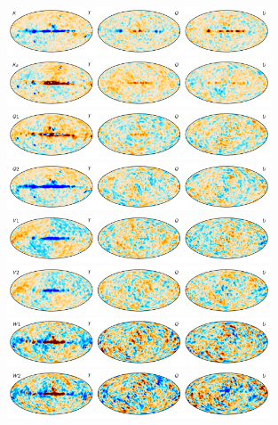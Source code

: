 \documentclass[twocolumn]{../../common/aa}
\begin{document}
\begin{figure}
	\centering
	\includegraphics[width=0.7\textwidth]{figures/compsep_res_K_IQU.pdf}\\
	\includegraphics[width=0.7\textwidth]{figures/compsep_res_Ka_IQU.pdf}\\
	\includegraphics[width=0.7\textwidth]{figures/compsep_res_Q1_IQU.pdf}\\
	\includegraphics[width=0.7\textwidth]{figures/compsep_res_Q2_IQU.pdf}\\
	\includegraphics[width=0.7\textwidth]{figures/compsep_res_V1_IQU.pdf}\\
	\includegraphics[width=0.7\textwidth]{figures/compsep_res_V2_IQU.pdf}\\
	\includegraphics[width=0.7\textwidth]{figures/compsep_res_W1_IQU.pdf}\\
	\includegraphics[width=0.7\textwidth]{figures/compsep_res_W2_IQU.pdf}\\

\end{figure}
\end{document}
